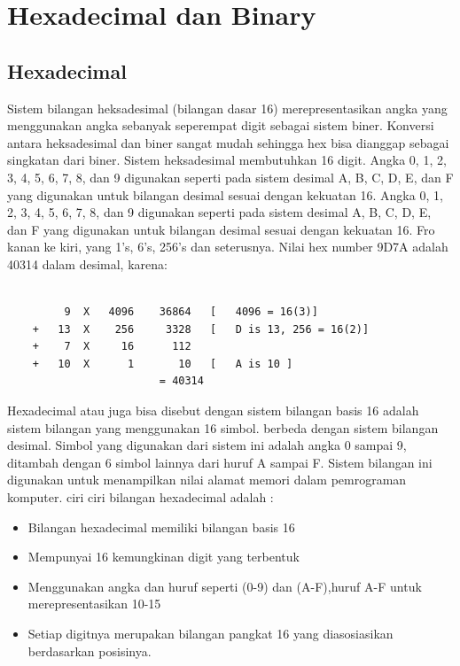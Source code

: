 
\section {Hexadecimal dan Binary}

	\subsection {Hexadecimal}
	Sistem bilangan heksadesimal (bilangan dasar 16) merepresentasikan angka yang menggunakan angka sebanyak seperempat digit sebagai sistem biner. Konversi antara heksadesimal dan biner sangat mudah sehingga hex bisa dianggap sebagai singkatan dari biner. Sistem heksadesimal membutuhkan 16 digit. Angka 0, 1, 2, 3, 4, 5, 6, 7, 8, dan 9 digunakan seperti pada sistem desimal A, B, C, D, E, dan F yang digunakan untuk bilangan desimal sesuai dengan kekuatan 16. Angka 0, 1, 2, 3, 4, 5, 6, 7, 8, dan 9 digunakan seperti pada sistem desimal A, B, C, D, E, dan F yang digunakan untuk bilangan desimal sesuai dengan kekuatan 16. Fro kanan ke kiri, yang 1's, 6's, 256's dan seterusnya. Nilai hex number 9D7A adalah 40314 dalam desimal, karena:
	\begin{verbatim}

		 9	X	4096	36864	[	4096 = 16(3)]
	+	13	X	 256	 3328	[	D is 13, 256 = 16(2)]
	+	 7	X	  16	  112
	+	10	X	   1	   10	[	A is 10	]
						= 40314
	\end{verbatim}
	
	Hexadecimal atau juga bisa disebut dengan sistem bilangan basis 16 adalah sistem bilangan yang menggunakan 16 simbol. berbeda dengan sistem bilangan desimal. Simbol yang digunakan dari sistem ini adalah angka 0 sampai 9, ditambah dengan 6 simbol lainnya dari huruf A sampai F. Sistem bilangan ini digunakan untuk menampilkan nilai alamat memori dalam pemrograman komputer.
	ciri ciri bilangan hexadecimal adalah :

	\begin{itemize}
		\item Bilangan hexadecimal memiliki bilangan basis 16
		\item Mempunyai 16 kemungkinan digit yang terbentuk
		\item Menggunakan angka dan huruf seperti (0-9) dan (A-F),huruf A-F untuk merepresentasikan 10-15
		\item Setiap digitnya merupakan bilangan pangkat 16 yang diasosiasikan berdasarkan posisinya.
	\end{itemize}

